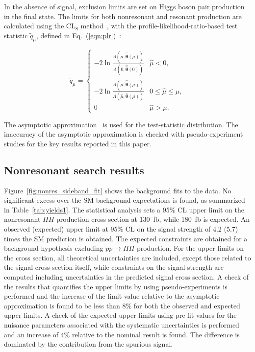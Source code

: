 \documentclass[PAPER, cernpreprint, texlive=2016, paper=a4, USenglish, texmf]{atlasdoc}
\begin{document}
In the absence of signal, exclusion limits are set on Higgs boson pair production in the \yybb{} final state. The limits for both nonresonant
and resonant production are calculated using the $\textrm{CL}_{\textrm{S}}$ method~\cite{Read:2002hq}, with the profile-likelihood-ratio-based test
statistic $\tilde{q}_{\mu}$, defined in Eq.~(\ref{eqn:plr})~\cite{Cowan:2010js}:
 
\begin{equation}
\label{eqn:plr}
\tilde{q}_\mu = \begin{cases}
-2\ln\frac{\Lambda(\mu,\hat{\hat{\pmb{\theta}}}(\mu))}{\Lambda(0,\hat{\hat{\pmb{\theta}}}(0))} & \hat{\mu} < 0,\\
-2\ln\frac{\Lambda(\mu,\hat{\hat{\pmb{\theta}}}(\mu))}{\Lambda(\hat{\mu},\hat{\pmb{\theta}}(\mu))} & 0 \leq \hat{\mu} \leq \mu,\\
0 & \hat{\mu} > \mu.
\end{cases}
\end{equation}
 
The asymptotic approximation~\cite{Cowan:2010js} is used for the test-statistic distribution. The inaccuracy of the asymptotic approximation is checked with pseudo-experiment studies for the key results reported in this paper.
 
 
 
\subsection{Nonresonant search results}
 
 
Figure~\ref{fig:nonres_sideband_fit} shows the background fits to the data. No significant excess over the SM background expectations is found, as summarized in Table~\ref{tab:yields1}.
The statistical analysis sets a  95\% CL upper limit on the nonresonant $HH$ production cross section at 130~fb, while 180~fb is expected.  An observed (expected) upper limit  at 95\% CL on the signal strength of 4.2 (5.7) times the SM prediction is obtained.  The  expected constraints are obtained for a background hypothesis excluding $pp \rightarrow HH$ production.
For the upper limits on the cross section, all theoretical uncertainties are included, except those related to the signal cross section itself, while constraints on the signal strength are computed including uncertainties in the predicted signal cross section. A check of the results that quantifies the upper limits by using pseudo-experiments is performed and the increase of the limit value relative to the asymptotic approximation is found to be less than 8\% for both the  observed and expected upper limits. A check of the expected upper limits using pre-fit values for the nuisance parameters associated with the systematic uncertainties is performed and an increase of 4\% relative to the nominal result is found. The difference is dominated by the contribution from the spurious signal.
 
\end{document}
